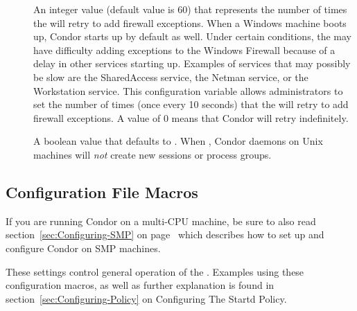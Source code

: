 \begin{description}
\item[]
  \label{param:WindowsFirewallFailureRetry} 
  An integer value (default value is 60) that represents
  the number of times the  will retry to add
  firewall exceptions.
  When a Windows machine boots
  up, Condor starts up by default as well. Under certain conditions, the
   may have difficulty adding exceptions to the Windows
  Firewall because of a delay in other services starting up.
  Examples of services that may possibly be slow are the 
  SharedAccess service, the Netman service, or the Workstation service.
  This configuration variable allows administrators to set the number of
  times (once every 10 seconds) that the  will retry
  to add firewall exceptions. A value of 0 means that Condor will
  retry indefinitely.

\item[]
  \label{param:UseProcessGroups} 
  A boolean value that defaults to .  When ,
  Condor daemons on Unix machines will \emph{not} create new sessions
  or process groups. 

\end{description}

\subsection{\label{sec:Startd-Config-File-Entries}
Configuration File Macros}

\Note If you are running Condor on a multi-CPU machine, be sure
to also read section~\ref{sec:Configuring-SMP} on
page~\pageref{sec:Configuring-SMP} which describes how to set up and
configure Condor on SMP machines.

These settings control general operation of the .
Examples using these configuration macros,
as well as further explanation is found in
section~\ref{sec:Configuring-Policy} on
Configuring The Startd Policy.

